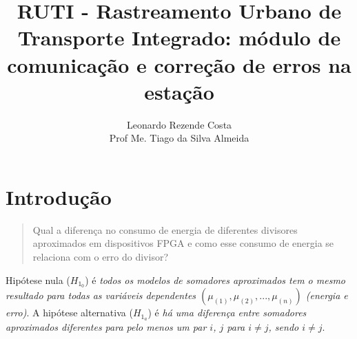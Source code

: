 \documentclass[12pt]{uftpibicsic}
\title{RUTI - Rastreamento Urbano de Transporte Integrado: módulo de comunicação e correção de erros na estação}
\author{Leonardo Rezende Costa\inst{1} \\Prof Me. Tiago da Silva Almeida\inst{2}}
\begin{document}
\mainmatter
\maketitle

\begin{spacing}{1}
\begin{abstract}

\end{abstract}

\begin{foreignabstract}

\end{foreignabstract}
\end{spacing}


\chapter{Introdução}





\begin{quote}
Qual a diferença no consumo de energia de diferentes divisores aproximados em dispositivos FPGA e como esse consumo de energia se relaciona com o erro do divisor?
\end{quote}




Hipótese nula ($H_{1_{0}}$) é \textit{todos os modelos de somadores aproximados tem o mesmo resultado para todas as variáveis dependentes $(\mu_{(1)}, \mu_{(2)}, ..., \mu_{(n)})$ (energia e erro)}. A hipótese alternativa ($H_{1_{a}}$) é \textit{há uma diferença entre somadores aproximados diferentes para pelo menos um par $i$, $j$ para $i \neq j$, sendo $i \neq j$}.

\end{document}
